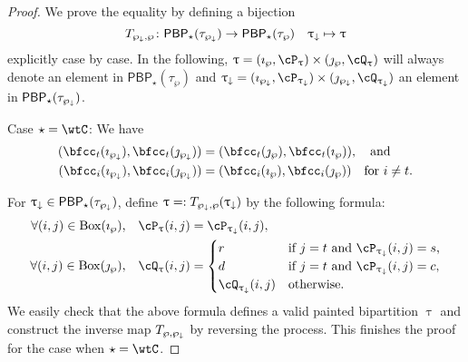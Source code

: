 \documentclass[12pt,a4paper]{amsart}
\numberwithin{equation}{section}
\theoremstyle{remark}
\def\BOX#1{\mathrm{Box}(#1)}
\def\AND{\quad \text{and} \quad}
\def\PBP{\mathsf{PBP}}
\def\PBPs{\mathsf{PBP}_{\star}}
\begin{document}
\begin{proof}
  We prove the equality by defining a bijection
  \[
    T_{\PPm,\wp}\colon \PBP_{\star}(\tau_{\PPm}) \rightarrow \PBP_{\star}(\tau_{\wp})\quad \uptaum \mapsto \uptau
  \]
  explicitly case by case.
  In the following, $\uptau = (\imath_{\wp},\cP_{\uptau})\times (\jmath_{\wp},\cQ_{\uptau})$
  will always denote an element in $\PBP_{\star}(\tau_{\wp})$ and
  $\uptaum = (\imath_{\PPm},\cP_{\uptaum})\times (\jmath_{\PPm},\cQ_{\uptaum})$
  an element in $\PBP_{\star}(\tau_{\PPm})$.

  \medskip




  \smallskip

  Case $\star = \wtC$:
  We have
  \[
    \begin{split}
      (\bfcc_{t}(\imath_{\PPm}), \bfcc_{t}(\jmath_{\PPm}))
      &= (\bfcc_{t}(\jmath_{\wp}), \bfcc_{t}(\imath_{\wp})),\AND\\
      (\bfcc_{i}(\imath_{\PPm}), \bfcc_{i}(\jmath_{\PPm}) )
      & = (\bfcc_{i}(\imath_{\wp}), \bfcc_{i}(\jmath_{\wp}) ) \quad \text{for $i\neq t$}.
    \end{split}
  \]

  For $\uptaum\in\PBPs(\tau_{\PPm})$, define $\uptau=:T_{\wp_{\downarrow},\wp}(\uptau_{\downarrow})$ by the following formula:
  \[
    \begin{split}
      \text{$\forall (i,j)\in \BOX{\imath_{\wp}}$,} \quad   \cP_{\uptau}(i,j) &=  \cP_{\uptaum}(i,j),\\
      \text{$\forall (i,j)\in \BOX{\jmath_{\wp}}$,} \quad \cQ_{\uptau}(i,j) &= \begin{cases}
        r& \text{if $j=t$ and  $\cP_{\uptaum}(i,j)=s$,}\\
        d& \text{if $j=t$ and  $\cP_{\uptaum}(i,j)=c$,}\\
        \cQ_{\uptaum}(i,j) &\text{otherwise.}
      \end{cases}
    \end{split}
  \]
 We easily check that the above formula defines a valid
  painted bipartition $\uptau$ and construct the inverse map $T_{\wp,\wp_{\downarrow}}$ by reversing the process.
  This finishes the proof for the case when $\star=\wtC$. \medskip


\end{proof}
\end{document}
